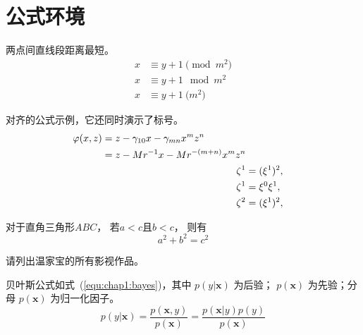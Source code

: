 % 
%
%
% 
%
\chapter{公式环境}

    \begin{axiom}
        \rm 两点间直线段距离最短。  
        \begin{align}
            x&\equiv y+1\pmod{m^2}\\
            x&\equiv y+1\mod{m^2}\\
            x&\equiv y+1\pod{m^2}
        \end{align}
    \end{axiom}

    \begin{remark}
    \rm 对齐的公式示例，它还同时演示了标号。
    \begin{align}
    \begin{split} 
    \varphi(x,z)
    &=z-\gamma_{10}x-\gamma_{mn}x^mz^n\\
    &=z-Mr^{-1}x-Mr^{-(m+n)}x^mz^n
    \end{split} \notag \\
    \noindent\zeta^1&=(\xi^1)^2,\\
    \zeta^1 &=\xi^0\xi^1,\\
    \zeta^2 &=(\xi^1)^2,
    \end{align}
    \end{remark}

    \begin{theorem}
      \rm 对于直角三角形$ABC$， 若$a<c$且$b<c$， 则有
        \begin{equation}
          a^2+b^2=c^2
        \end{equation}
    \end{theorem}


    \begin{exercise}
          \rm 请列出温家宝的所有影视作品。
    \end{exercise}
        
    贝叶斯公式如式~(\ref{equ:chap1:bayes})，其中 $p(y|\mathbf{x})$ 为后验；
    $p(\mathbf{x})$ 为先验；分母 $p(\mathbf{x})$ 为归一化因子。
    \begin{equation}
        \label{equ:chap1:bayes}
        p(y|\mathbf{x}) = \frac{p(\mathbf{x},y)}{p(\mathbf{x})}=
        \frac{p(\mathbf{x}|y)p(y)}{p(\mathbf{x})} 
    \end{equation}

